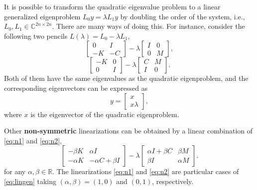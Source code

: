 It is possible to transform the quadratic eigenvalue problem to a linear generalized eigenproblem $L_0y=\lambda L_1y$ by doubling the order of the system, i.e., $L_0,L_1\in\mathbb{C}^{2n\times 2n}$. There are many ways of doing this. For instance, consider the following two pencils $L(\lambda)=L_0-\lambda L_1$,
\begin{equation}
\label{eq:n1}
\begin{bmatrix}0 & I\\-K & -C\end{bmatrix}-\lambda\begin{bmatrix}I & 0\\0 & M\end{bmatrix},
\end{equation}
\begin{equation}
\label{eq:n2}
\begin{bmatrix}-K & 0\\0 & I\end{bmatrix}-\lambda\begin{bmatrix}C & M\\I & 0\end{bmatrix}.
\end{equation}
Both of them have the same eigenvalues as the quadratic eigenproblem, and the corresponding eigenvectors can be expressed as
\begin{equation}
\label{eq:linevec}
y=\begin{bmatrix}x\\x\lambda\end{bmatrix},
\end{equation}
where $x$ is the eigenvector of the quadratic eigenproblem.

Other \textbf{non-symmetric} linearizations can be obtained by a linear combination of \eqref{eq:n1} and \eqref{eq:n2},
\begin{equation}
\label{eq:lingen}
\begin{bmatrix}-\beta K & \alpha I\\-\alpha K & -\alpha C+\beta I\end{bmatrix}-\lambda\begin{bmatrix}\alpha I+\beta C & \beta M\\\beta I & \alpha M\end{bmatrix}.
\end{equation}
for any $\alpha,\beta\in\mathbb{R}$. The linearizations \eqref{eq:n1} and \eqref{eq:n2} are particular cases of \eqref{eq:lingen} taking $(\alpha,\beta)=(1,0)$ and $(0,1)$, respectively.

